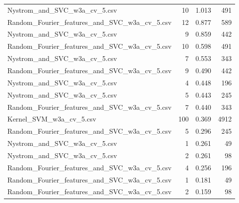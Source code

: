 \begin{tabularx}{\textwidth}{lrrr}
                Nystrom\_and\_SVC\_w3a\_cv\_5.csv &       10 &               1.013 &           491 \\
Random\_Fourier\_features\_and\_SVC\_w3a\_cv\_5.csv &       12 &               0.877 &           589 \\
                Nystrom\_and\_SVC\_w3a\_cv\_5.csv &        9 &               0.859 &           442 \\
Random\_Fourier\_features\_and\_SVC\_w3a\_cv\_5.csv &       10 &               0.598 &           491 \\
                Nystrom\_and\_SVC\_w3a\_cv\_5.csv &        7 &               0.553 &           343 \\
Random\_Fourier\_features\_and\_SVC\_w3a\_cv\_5.csv &        9 &               0.490 &           442 \\
                Nystrom\_and\_SVC\_w3a\_cv\_5.csv &        4 &               0.448 &           196 \\
                Nystrom\_and\_SVC\_w3a\_cv\_5.csv &        5 &               0.443 &           245 \\
Random\_Fourier\_features\_and\_SVC\_w3a\_cv\_5.csv &        7 &               0.440 &           343 \\
                     Kernel\_SVM\_w3a\_cv\_5.csv &      100 &               0.369 &          4912 \\
Random\_Fourier\_features\_and\_SVC\_w3a\_cv\_5.csv &        5 &               0.296 &           245 \\
                Nystrom\_and\_SVC\_w3a\_cv\_5.csv &        1 &               0.261 &            49 \\
                Nystrom\_and\_SVC\_w3a\_cv\_5.csv &        2 &               0.261 &            98 \\
Random\_Fourier\_features\_and\_SVC\_w3a\_cv\_5.csv &        4 &               0.256 &           196 \\
Random\_Fourier\_features\_and\_SVC\_w3a\_cv\_5.csv &        1 &               0.181 &            49 \\
Random\_Fourier\_features\_and\_SVC\_w3a\_cv\_5.csv &        2 &               0.159 &            98 \\
\bottomrule
\end{tabularx}

